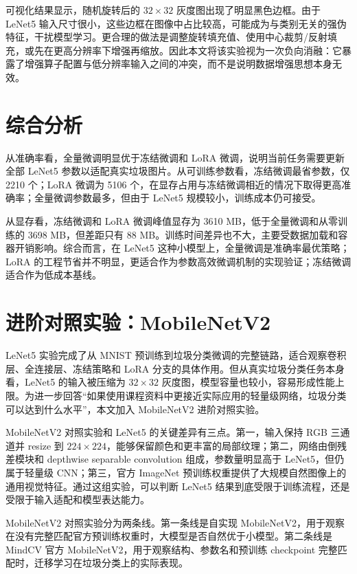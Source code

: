 可视化结果显示，随机旋转后的 $32\times32$ 灰度图出现了明显黑色边框。由于 LeNet5 输入尺寸很小，这些边框在图像中占比较高，可能成为与类别无关的强伪特征，干扰模型学习。更合理的做法是调整旋转填充值、使用中心裁剪/反射填充，或先在更高分辨率下增强再缩放。因此本文将该实验视为一次负向消融：它暴露了增强算子配置与低分辨率输入之间的冲突，而不是说明数据增强思想本身无效。

\section{综合分析}

从准确率看，全量微调明显优于冻结微调和 LoRA 微调，说明当前任务需要更新全部 LeNet5 参数以适配真实垃圾图片。从可训练参数看，冻结微调最省参数，仅 2210 个；LoRA 微调为 5106 个，在显存占用与冻结微调相近的情况下取得更高准确率；全量微调参数最多，但由于 LeNet5 规模较小，训练成本仍可接受。

从显存看，冻结微调和 LoRA 微调峰值显存为 3610 MB，低于全量微调和从零训练的 3698 MB，但差距只有 88 MB。训练时间差异也不大，主要受数据加载和容器开销影响。综合而言，在 LeNet5 这种小模型上，全量微调是准确率最优策略；LoRA 的工程节省并不明显，更适合作为参数高效微调机制的实现验证；冻结微调适合作为低成本基线。

\section{进阶对照实验：MobileNetV2}

LeNet5 实验完成了从 MNIST 预训练到垃圾分类微调的完整链路，适合观察卷积层、全连接层、冻结策略和 LoRA 分支的具体作用。但从真实垃圾分类任务本身看，LeNet5 的输入被压缩为 $32\times32$ 灰度图，模型容量也较小，容易形成性能上限。为进一步回答“如果使用课程资料中更接近实际应用的轻量级网络，垃圾分类可以达到什么水平”，本文加入 MobileNetV2 进阶对照实验。

MobileNetV2 对照实验和 LeNet5 的关键差异有三点。第一，输入保持 RGB 三通道并 resize 到 $224\times224$，能够保留颜色和更丰富的局部纹理；第二，网络由倒残差模块和 depthwise separable convolution 组成，参数量明显高于 LeNet5，但仍属于轻量级 CNN；第三，官方 ImageNet 预训练权重提供了大规模自然图像上的通用视觉特征。通过这组实验，可以判断 LeNet5 结果到底受限于训练流程，还是受限于输入适配和模型表达能力。

MobileNetV2 对照实验分为两条线。第一条线是自实现 MobileNetV2，用于观察在没有完整匹配官方预训练权重时，大模型是否自然优于小模型。第二条线是 MindCV 官方 MobileNetV2，用于观察结构、参数名和预训练 checkpoint 完整匹配时，迁移学习在垃圾分类上的实际表现。

